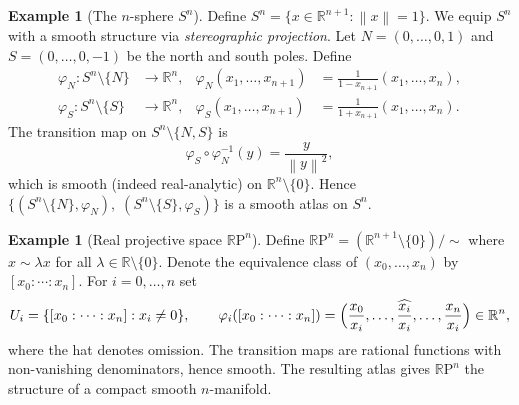 \documentclass[12pt,a4paper,openany]{book}
\theoremstyle{definition}
\newtheorem{example}[theorem]{Example}
\theoremstyle{remark}
\newcommand{\R}{\mathbb{R}}
\newcommand{\RP}{\mathbb{R}\mathrm{P}}
\newcommand{\norm}[1]{\left\lVert #1 \right\rVert}
\newcommand{\rel}{\sim}
\begin{document}
\begin{example}[The $n$-sphere $S^n$]\label{ex:sphere}
Define $S^n = \{x \in \R^{n+1} : \norm{x} = 1\}$.  We equip $S^n$ with a
smooth structure via \emph{stereographic projection}.
Let $N = (0,\ldots,0,1)$ and $S = (0,\ldots,0,-1)$ be the north and south
poles.  Define
\begin{align*}
  \varphi_N \colon S^n \setminus \{N\} &\longrightarrow \R^n, &
  \varphi_N(x_1,\ldots,x_{n+1}) &= \frac{1}{1 - x_{n+1}}
    (x_1, \ldots, x_n), \\
  \varphi_S \colon S^n \setminus \{S\} &\longrightarrow \R^n, &
  \varphi_S(x_1,\ldots,x_{n+1}) &= \frac{1}{1 + x_{n+1}}
    (x_1, \ldots, x_n).
\end{align*}
The transition map on $S^n \setminus \{N,S\}$ is
\[
  \varphi_S \circ \varphi_N^{-1}(y) = \frac{y}{\norm{y}^2},
\]
which is smooth (indeed real-analytic) on $\R^n \setminus \{0\}$.  Hence
$\{(S^n \setminus \{N\}, \varphi_N),\; (S^n \setminus \{S\}, \varphi_S)\}$
is a smooth atlas on $S^n$.
\end{example}


\begin{center}
\label{fig:stereographic}
\end{center}

\begin{example}[Real projective space $\RP^n$]\label{ex:RPn}
Define $\RP^n = ({\R^{n+1} \setminus \{0\}})/{\rel}$ where
$x \rel \lambda x$ for all $\lambda \in \R \setminus \{0\}$.
Denote the equivalence class of $(x_0,\ldots,x_n)$ by
$[x_0 : \cdots : x_n]$.  For $i = 0,\ldots,n$ set
\[
  U_i = \{[x_0:\cdots:x_n] : x_i \neq 0\}, \qquad
  \varphi_i([x_0:\cdots:x_n])
  = \Bigl(\frac{x_0}{x_i},\ldots,\widehat{\frac{x_i}{x_i}},\ldots,
    \frac{x_n}{x_i}\Bigr) \in \R^n,
\]
where the hat denotes omission.  The transition maps are rational functions
with non-vanishing denominators, hence smooth.  The resulting atlas gives
$\RP^n$ the structure of a compact smooth $n$-manifold.
\end{example}
\end{document}

